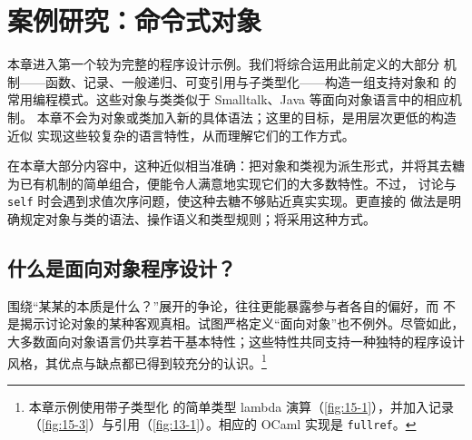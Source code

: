 
\chapter{案例研究：命令式对象}
\label{chap:18}

本章进入第一个较为完整的程序设计示例。我们将综合运用此前定义的大部分
机制——函数、记录、一般递归、可变引用与子类型化——构造一组支持对象和
的
常用编程模式。这些对象与类类似于 Smalltalk、Java 等面向对象语言中的相应机制。
本章不会为对象或类加入新的具体语法；这里的目标，是用层次更低的构造近似
实现这些较复杂的语言特性，从而理解它们的工作方式。

在本章大部分内容中，这种近似相当准确：把对象和类视为派生形式，并将其去糖
为已有机制的简单组合，便能令人满意地实现它们的大多数特性。不过，
讨论与
\texttt{self} 时会遇到求值次序问题，使这种去糖不够贴近真实实现。更直接的
做法是明确规定对象与类的语法、操作语义和类型规则；将采用这种方式。

\section{什么是面向对象程序设计？}
\label{sec:18.1}

围绕“某某的本质是什么？”展开的争论，往往更能暴露参与者各自的偏好，而
不是揭示讨论对象的某种客观真相。试图严格定义“面向对象”也不例外。尽管如此，
大多数面向对象语言仍共享若干基本特性；这些特性共同支持一种独特的程序设计
风格，其优点与缺点都已得到较充分的认识。\footnote{本章示例使用带子类型化
的简单类型 lambda 演算（\cref{fig:15-1}），并加入记录
（\cref{fig:15-3}）与引用（\cref{fig:13-1}）。相应的 OCaml 实现是
\texttt{fullref}。}

